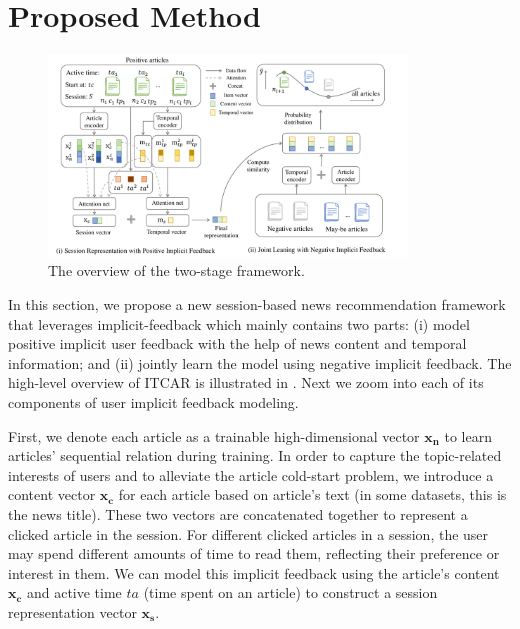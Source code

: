 \section{Proposed Method}
\label{sec:method}

\begin{figure}[th]
    \centering
    \includegraphics[width=0.85\textwidth]{fig/architecture.pdf}
    \caption{The overview of the two-stage framework.}
    \label{fig:architecture}
\end{figure}

In this section, we propose a new session-based news recommendation
framework that leverages implicit-feedback which mainly contains two parts: 
(i) model positive implicit user feedback with the help of news content and 
temporal information; 
and (ii) jointly learn the model using negative implicit feedback.
The high-level overview of ITCAR is illustrated in . 
Next we zoom into each of its components of user implicit feedback modeling.

First, we denote each article as a trainable high-dimensional vector 
$\mathbf{x_n}$ to learn articles' sequential relation during training. 
In order to capture the topic-related interests of users and to 
alleviate the article cold-start problem, we introduce a content vector $\mathbf{x_c}$ 
for each article based on article's text (in some datasets, this is the news title). 
These two vectors are concatenated together to represent a clicked article 
in the session. For different clicked articles in a session, 
the user may spend different amounts of time to read them, reflecting their preference
or interest in them. We can model this implicit feedback using the
article's content $\mathbf{x_c}$ and active time $ta$ (time spent on an article) 
to construct a session representation vector $\mathbf{x_s}$. 

